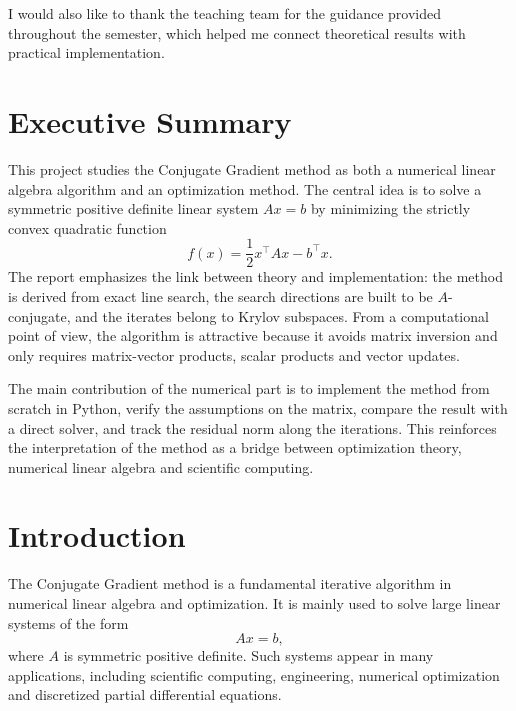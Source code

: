 \documentclass[11pt,a4paper]{report}
\theoremstyle{definition}
\theoremstyle{plain}
\theoremstyle{remark}
\begin{document}
I would also like to thank the teaching team for the guidance provided throughout the semester, which helped me connect theoretical results with practical implementation.

\vspace{0.8cm}

\section*{Executive Summary}

\begin{infobox}
This project studies the Conjugate Gradient method as both a numerical linear algebra algorithm and an optimization method. The central idea is to solve a symmetric positive definite linear system $Ax=b$ by minimizing the strictly convex quadratic function
\[
f(x)=\frac12 x^\top A x-b^\top x.
\]
The report emphasizes the link between theory and implementation: the method is derived from exact line search, the search directions are built to be $A$-conjugate, and the iterates belong to Krylov subspaces. From a computational point of view, the algorithm is attractive because it avoids matrix inversion and only requires matrix-vector products, scalar products and vector updates.

The main contribution of the numerical part is to implement the method from scratch in Python, verify the assumptions on the matrix, compare the result with a direct solver, and track the residual norm along the iterations. This reinforces the interpretation of the method as a bridge between optimization theory, numerical linear algebra and scientific computing.
\end{infobox}

\vspace{0.8cm}

\section*{Introduction}

The Conjugate Gradient method is a fundamental iterative algorithm in numerical linear algebra and optimization. It is mainly used to solve large linear systems of the form
\[
A x = b,
\]
where $A$ is symmetric positive definite. Such systems appear in many applications, including scientific computing, engineering, numerical optimization and discretized partial differential equations.
\end{document}
